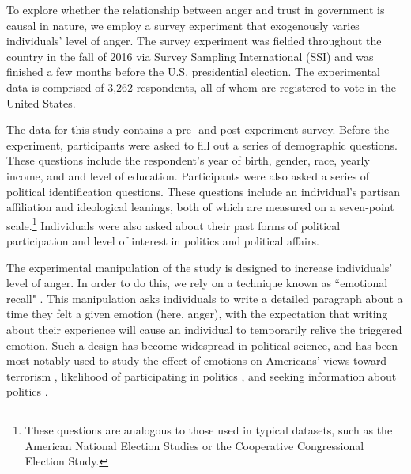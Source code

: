 \documentclass[12t, letterpaper]{article}
\begin{document}
To explore whether the relationship between anger and trust in government is causal in nature, we employ a survey experiment that exogenously varies individuals' level of anger. The survey experiment was fielded throughout the country in the fall of 2016 via Survey Sampling International (SSI) and was finished a few months before the U.S. presidential election. The experimental data is comprised of 3,262 respondents, all of whom are registered to vote in the United States. 

The data for this study contains a pre- and post-experiment survey. Before the experiment, participants were asked to fill out a series of demographic questions. These questions include the respondent's year of birth, gender, race, yearly income, and and level of education. Participants were also asked a series of political identification questions. These questions include an individual's partisan affiliation and ideological leanings, both of which are measured on a seven-point scale.\footnote{These questions are analogous to those used in typical datasets, such as the American National Election Studies or the Cooperative Congressional Election Study.} Individuals were also asked about their past forms of political participation and level of interest in politics and political affairs.

The experimental manipulation of the study is designed to increase individuals' level of anger. In order to do this, we rely on a technique known as ``emotional recall" \citep{lerneretal2003effects, lerner_kelter2001}. This manipulation asks individuals to write a detailed paragraph about a time they felt a given emotion (here, anger), with the expectation that writing about their experience will cause an individual to temporarily relive the triggered emotion. Such a design has become widespread in political science, and has been most notably used to study the effect of emotions on Americans' views toward terrorism \citep{lerneretal2003effects}, likelihood of participating in politics \citep{vbggh}, and seeking information about politics \citep{valentinoetal2008}.
\end{document}
